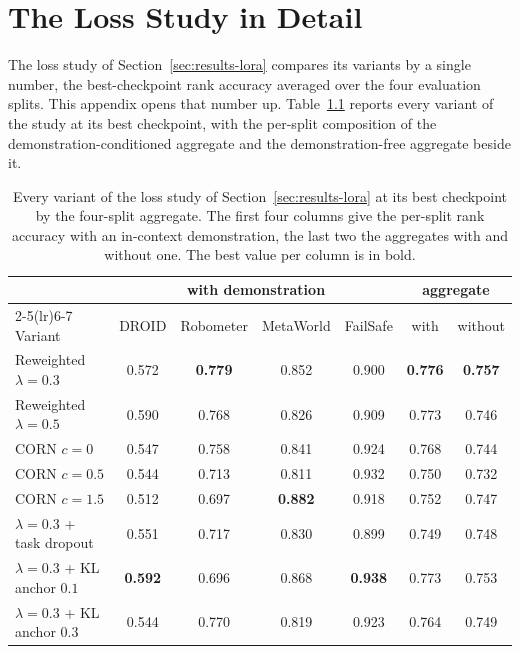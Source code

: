 \chapter{The Loss Study in Detail}
\label{apx:lambda}

The loss study of Section~\ref{sec:results-lora} compares its variants by a single number, the best-checkpoint rank accuracy averaged over the four evaluation splits. This appendix opens that number up. Table~\ref{tab:lora-breakdown} reports every variant of the study at its best checkpoint, with the per-split composition of the demonstration-conditioned aggregate and the demonstration-free aggregate beside it.

\begin{table}[h]
\centering\footnotesize
\caption[The loss study per split]{Every variant of the loss study of Section~\ref{sec:results-lora} at its best checkpoint by the four-split aggregate. The first four columns give the per-split rank accuracy with an in-context demonstration, the last two the aggregates with and without one. The best value per column is in bold.}
\label{tab:lora-breakdown}
\begin{tabular}{@{}lcccccc@{}}
\toprule
 & \multicolumn{4}{c}{with demonstration} & \multicolumn{2}{c}{aggregate} \\
\cmidrule(lr){2-5}\cmidrule(lr){6-7}
Variant & DROID & Robometer & MetaWorld & FailSafe & with & without \\
\midrule
Reweighted $\lambda=0.3$ & 0.572 & \textbf{0.779} & 0.852 & 0.900 & \textbf{0.776} & \textbf{0.757} \\
Reweighted $\lambda=0.5$ & 0.590 & 0.768 & 0.826 & 0.909 & 0.773 & 0.746 \\
CORN $c=0$ & 0.547 & 0.758 & 0.841 & 0.924 & 0.768 & 0.744 \\
CORN $c=0.5$ & 0.544 & 0.713 & 0.811 & 0.932 & 0.750 & 0.732 \\
CORN $c=1.5$ & 0.512 & 0.697 & \textbf{0.882} & 0.918 & 0.752 & 0.747 \\
$\lambda=0.3$ + task dropout & 0.551 & 0.717 & 0.830 & 0.899 & 0.749 & 0.748 \\
$\lambda=0.3$ + KL anchor $0.1$ & \textbf{0.592} & 0.696 & 0.868 & \textbf{0.938} & 0.773 & 0.753 \\
$\lambda=0.3$ + KL anchor $0.3$ & 0.544 & 0.770 & 0.819 & 0.923 & 0.764 & 0.749 \\
\bottomrule
\end{tabular}
\end{table}

